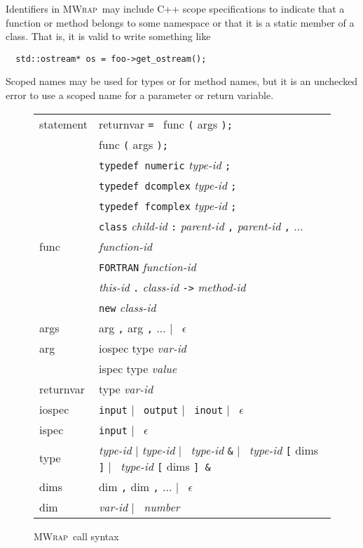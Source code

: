 \documentclass[12pt]{article}
\newcommand{\mwrap}{\textsc{MWrap}}
\newcommand{\gOR}{ $|$ }
\begin{document}
Identifiers in \mwrap\ may include C++ scope specifications to indicate
that a function or method belongs to some namespace or that it is a static
member of a class.  That is, it is valid to write something like
\begin{verbatim}
  std::ostream* os = foo->get_ostream();
\end{verbatim}
Scoped names may be used for types or for method names, but it is an
unchecked error to use a scoped name for a parameter or return
variable.

\begin{figure}
\begin{center}
\begin{tabular}{l@{ := }l}
  statement  & returnvar {\tt = } func {\tt (} args {\tt );} \\
             & func {\tt (}  args {\tt );} \\
             & {\tt typedef numeric} {\it type-id} {\tt ;} \\
             & {\tt typedef dcomplex} {\it type-id} {\tt ;} \\
             & {\tt typedef fcomplex} {\it type-id} {\tt ;} \\
             & {\tt class} {\it child-id} {\tt :}
               {\it parent-id} {\tt ,} {\it parent-id} {\tt ,} $\ldots$
\vspace{5mm} \\
  func       & {\it function-id} \\
             & {\tt FORTRAN} {\it function-id} \\
             & {\it this-id} {\tt .} {\it class-id} {\tt ->} {\it method-id}\\
             & {\tt new} {\it class-id}
\vspace{5mm} \\
  args       & arg {\tt ,} arg {\tt ,} $\ldots$ \gOR\ $\epsilon$ \\
  arg        & iospec type {\it var-id} \\
             & ispec  type {\it value} \\
  returnvar  & type {\it var-id} 
\vspace{5mm} \\
  iospec     & {\tt input} \gOR\ {\tt output} \gOR\ {\tt inout} \gOR\ 
               $\epsilon$ \\
  ispec      & {\tt input} \gOR\ $\epsilon$ \\
  type       & {\it type-id} \gOR 
               {\it type-id} {\tt *} \gOR\
               {\it type-id} {\tt \&} \gOR\
               {\it type-id} {\tt [} dims {\tt]} \gOR\
               {\it type-id} {\tt [} dims {\tt] \&} \\
  dims       & dim {\tt ,} dim {\tt ,} $\ldots$ \gOR\ $\epsilon$ \\
  dim        & {\it var-id} \gOR\ {\it number}
\end{tabular}
\caption{\mwrap\ call syntax}
\label{mwrap-syntax-fig}
\end{center}
\end{figure}
\end{document}
